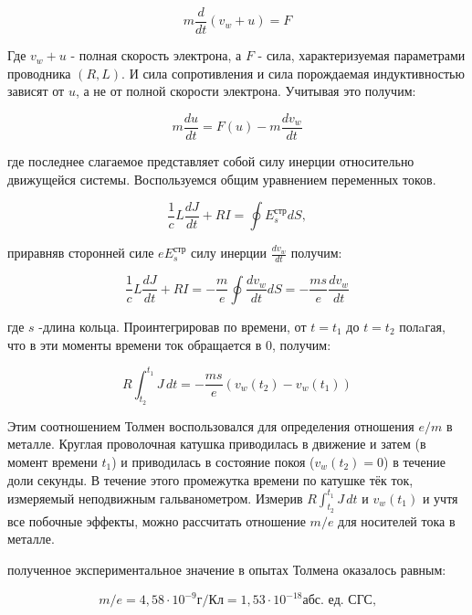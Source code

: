 \documentclass{lab}
\begin{document}
\begin{equation}
	m \frac{d}{dt} (v_{w} + u) = F
\end{equation}

Где $v_{w} + u$ - полная скорость электрона, а $F$ - сила, характеризуемая параметрами проводника $(R, L)$. И сила сопротивления и сила порождаемая индуктивностью зависят от $u$, а не от полной скорости электрона. Учитывая это получим:

\begin{equation}
	m \frac{du}{dt}  = F(u) - m \frac{dv_{w}}{dt}
\end{equation}

где последнее слагаемое представляет собой силу инерции относительно движущейся системы. Воспользуемся общим уравнением переменных токов.

\begin{equation}
	\frac{1}{c}L\frac{dJ}{dt} +RI  = \oint{E^{\text{стр}}_{s}}dS,
\end{equation}

приравняв сторонней силе $ eE^{\text{стр}}_{s}$ силу инерции $\frac{dv_{w}}{dt}$ получим:

\begin{equation}
	\frac{1}{c}L\frac{dJ}{dt} +RI  = - \frac{m}{e} \oint{\frac{dv_{w}}{dt}}dS = - \frac{ms}{e} \frac{dv_{w}}{dt}
\end{equation}

где $s$ -длина кольца. Проинтегрировав по времени, от $t = t_1$ до $t = t_2$ полaгая, что в эти моменты времени ток обращается в 0, получим:

\begin{equation}
	R\int_{t_2}^{t_1} J \,dt = - \frac{ms}{e} (v_{w}(t_2) - v_{w}(t_1))
\end{equation}

Этим соотношением Толмен воспользовался для определения отношения $e/m$ в металле. Круглая проволочная катушка приводилась в движение и затем (в момент времени $t_1$) и приводилась в состояние покоя ($v_{w}(t_2) = 0$) в течение доли секунды. В течение этого промежутка времени по катушке тёк ток, измеряемый неподвижным гальванометром. Измерив $R\int_{t_2}^{t_1} J \,dt$ и $v_{w}(t_1)$ и учтя все побочные эффекты, можно рассчитать отношение $m/e$ для носителей тока в металле.

полученное экспериментальное значение в опытах Толмена оказалось равным:

\begin{equation}
	m/e = 4,58 \cdot 10^{-9} \text{г/Кл} = 1,53 \cdot 10^{-18} \text{абс. ед. СГС,}
\end{equation}
\end{document}
